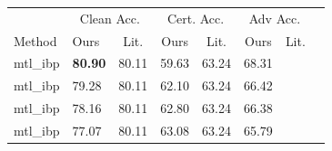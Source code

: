 \begin{tabular}{llcccccc}
\toprule
 & \multicolumn{2}{c}{Clean Acc.} & \multicolumn{2}{c}{Cert. Acc.} & \multicolumn{2}{c}{Adv Acc.} \\
Method & Ours & Lit. & Ours & Lit. & Ours & Lit. \\
\midrule
mtl\_ibp & \textbf{80.90} & 80.11 & 59.63 & 63.24 & 68.31 & \\
mtl\_ibp & 79.28 & 80.11 & 62.10 & 63.24 & 66.42 & \\
mtl\_ibp & 78.16 & 80.11 & 62.80 & 63.24 & 66.38 & \\
mtl\_ibp & 77.07 & 80.11 & 63.08 & 63.24 & 65.79 & \\
\bottomrule
\end{tabular}